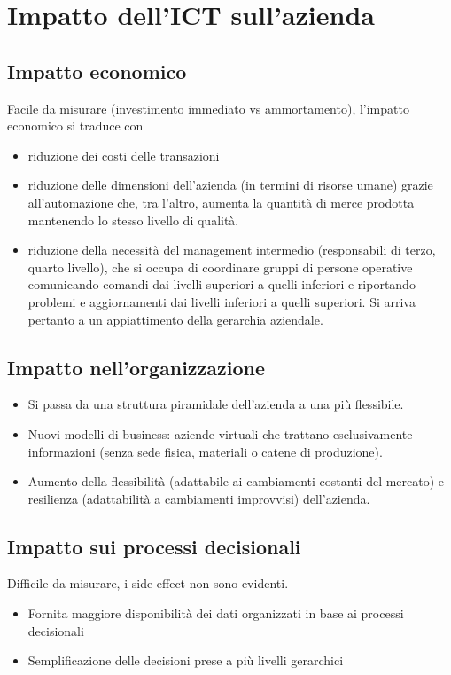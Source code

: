 \section{Impatto dell'ICT sull'azienda}
\subsection{Impatto economico}
Facile da misurare (investimento immediato vs ammortamento), l'impatto economico si traduce con
\begin{itemize}
\item riduzione dei costi delle transazioni
\item riduzione delle dimensioni dell'azienda (in termini di risorse umane) grazie all'automazione che, tra l'altro, aumenta la quantit\`a di merce prodotta mantenendo lo stesso livello di qualit\`a.
\item riduzione della necessit\`a del management intermedio (responsabili di terzo, quarto livello), che si occupa di coordinare gruppi di persone operative comunicando comandi dai livelli superiori a quelli inferiori e riportando problemi e aggiornamenti dai livelli inferiori a quelli superiori. Si arriva pertanto a un appiattimento della gerarchia aziendale.
\end{itemize}

\subsection{Impatto nell'organizzazione}
\begin{itemize}
\item Si passa da una struttura piramidale dell'azienda a una pi\`u flessibile.
\item Nuovi modelli di business: aziende virtuali che trattano esclusivamente informazioni (senza sede fisica, materiali o catene di produzione).
\item Aumento della flessibilit\`a (adattabile ai cambiamenti costanti del mercato) e resilienza (adattabilit\`a a cambiamenti improvvisi) dell'azienda.
\end{itemize}

\subsection{Impatto sui processi decisionali}
Difficile da misurare, i side-effect non sono evidenti.
\begin{itemize}
\item Fornita maggiore disponibilit\`a dei dati organizzati in base ai processi decisionali
\item Semplificazione delle decisioni prese a pi\`u livelli gerarchici
\end{itemize}






